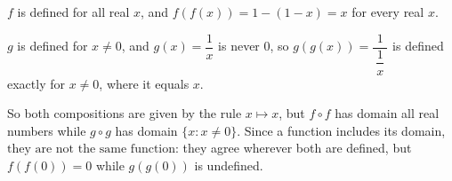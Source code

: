 $f$ is defined for all real $x$, and $f(f(x))=1-(1-x)=x$ for every real $x$.

$g$ is defined for $x\ne0$, and $g(x)=\dfrac{1}{x}$ is never $0$, so $g(g(x))=\dfrac{1}{\ \dfrac{1}{x}\ }$ is defined exactly for $x\ne0$, where it equals $x$.

So both compositions are given by the rule $x\mapsto x$, but $f\circ f$ has domain all real numbers while $g\circ g$ has domain $\{x:x\ne0\}$. Since a function includes its domain, $\boxed{\text{they are not the same function}}$: they agree wherever both are defined, but $f(f(0))=0$ while $g(g(0))$ is undefined.
